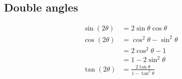 \subsection*{Double angles}

\begin{align*}
  \sin(2\theta)  &= 2 \sin \theta \cos \theta\\
  \cos(2\theta)  &= \cos^2 \theta - \sin^2 \theta\\
            &= 2 \cos^2 \theta - 1\\
            &= 1 - 2 \sin^2 \theta\\
  \tan(2\theta)  &= \frac{2 \tan \theta}{1 - \tan^2 \theta}
\end{align*}